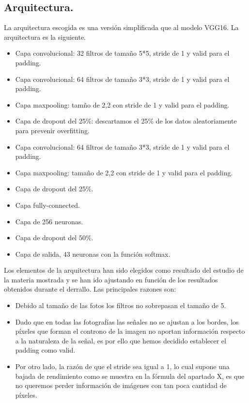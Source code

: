 \documentclass[a4paper,10pt]{article}
\begin{document}
\subsection{Arquitectura.}
La arquitectura escogida es una versión simplificada que al modelo VGG16. La arquitectura es la siguiente.
\begin{itemize}
\item Capa convolucional: 32 filtros de tamaño 5*5, stride de 1 y valid para el padding.
\item Capa convolucional: 64 filtros de tamaño 3*3, stride de 1 y valid para el padding.
\item Capa maxpooling: tamño de 2,2 con stride de 1 y valid para el padding.
\item Capa de dropout del 25\%: descartamos el 25\% de los datos aleatoriamente para prevenir overfitting.
\item Capa convolucional: 64 filtros de tamaño 3*3, stride de 1 y valid para el padding.
\item Capa maxpooling: tamaño de 2,2 con stride de 1 y valid para el padding.
\item Capa de dropout del 25\%.
\item Capa fully-connected.
\item Capa de 256 neuronas.
\item Capa de dropout del 50\%.
\item Capa de salida, 43 neuronas con la función softmax.
\end{itemize}
Los elementos de la arquitectura han sido elegidos como resultado del estudio de la materia mostrada y se han ido ajustando en función de los resultados obtenidos durante el derrallo. Las principales razones son:
\begin{itemize}
\item Debido al tamaño de las fotos los filtros no sobrepasan el tamaño de 5. 
\item Dado que en todas las fotografías las señales no se ajustan a los bordes, los píxeles que forman el controno de la imagen no aportan información respecto a la naturaleza de la señal, es por ello que hemos decidido establecer el padding como valid.
\item Por otro lado, la razón de que el stride sea igual a 1, lo cual supone una bajada de rendimiento como se muestra en la fórmula del apartado X, es que no queremos perder información de imágenes con tan poca cantidad de píxeles.
\end{itemize}
\end{document}
